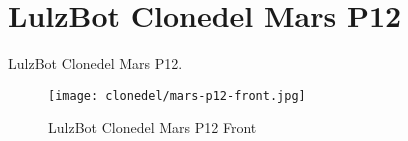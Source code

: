%
%
%
%
%

\section{LulzBot Clonedel Mars P12}
LulzBot Clonedel Mars P12.

\begin{figure}[h!]
\texttt{[image: clonedel/mars-p12-front.jpg]}
 \caption{LulzBot Clonedel Mars P12 Front}
 \label{fig:clonedel-mars-p12-front}
\end{figure}


